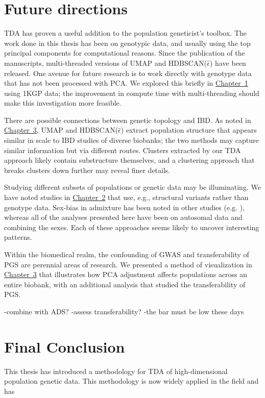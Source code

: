 \section{Future directions}

TDA has proven a useful addition to the population geneticist's toolbox. The work done in this thesis has been on genotypic data, and usually using the top principal components for computational reasons. Since the publication of the manuscripts, multi-threaded versions of UMAP and HDBSCAN($\hat{\epsilon}$) have been released. One avenue for future research is to work directly with genotype data that has not been processed with PCA. We explored this briefly in \hyperref[chap:chapter1]{Chapter~1} using 1KGP data; the improvement in compute time with multi-threading should make this investigation more feasible.

There are possible connections between genetic topology and IBD. As noted in \hyperref[chap:chapter3]{Chapter~3}, UMAP and HDBSCAN($\hat{\epsilon}$) extract population structure that appears similar in scale to IBD studies of diverse biobanks; the two methods may capture similar information but via different routes. Clusters extracted by our TDA approach likely contain substructure themselves, and a clustering approach that breaks clusters down further may reveal finer details.

Studying different subsets of populations or genetic data may be illuminating. We have noted studies in \hyperref[chap:chapter2]{Chapter~2} that use, e.g., structural variants rather than genotype data. Sex-bias in admixture has been noted in other studies (e.g. \citep{ongaro_evaluating_2021,korunes_sex-biased_2022,marcheco-teruel_cuba_2014}), whereas all of the analyses presented here have been on autosomal data and combining the sexes. Each of these approaches seems likely to uncover interesting patterns.

Within the biomedical realm, the confounding of GWAS and transferability of PGS are perennial areas of research. We presented a method of visualization in \hyperref[chap:chapter3]{Chapter~3} that illustrates how PCA adjustment affects populations across an entire biobank, with an additional analysis that studied the transferability of PGS.

-combine with ADS?
-assess transferability?
-the bar must be low these days


\section{Final Conclusion}
This thesis has introduced a methodology for TDA of high-dimensional population genetic data. This methodology is now widely applied in the field and has 


